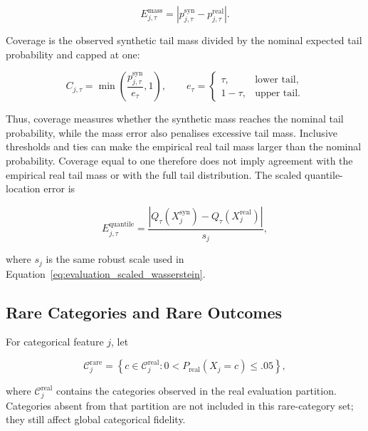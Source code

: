 \begin{equation}
    E_{j,\tau}^{\mathrm{mass}} =
        \left|p_{j,\tau}^{\mathrm{syn}}-p_{j,\tau}^{\mathrm{real}}\right|.
    \label{eq:evaluation_tail_mass}
\end{equation}

Coverage is the observed synthetic tail mass divided by the nominal expected
tail probability and capped at one:

\begin{equation}
    C_{j,\tau} = \min\left(
        \frac{p_{j,\tau}^{\mathrm{syn}}}{e_{\tau}},1\right),
    \qquad
    e_{\tau}=\begin{cases}
        \tau, & \text{lower tail},\\
        1-\tau, & \text{upper tail}.
    \end{cases}
    \label{eq:evaluation_tail_coverage}
\end{equation}

Thus, coverage measures whether the synthetic mass reaches the nominal tail
probability, while the mass error also penalises excessive tail mass.
Inclusive thresholds and ties can make the empirical real tail mass larger
than the nominal probability. Coverage equal to one therefore does not imply
agreement with the empirical real tail mass or with the full tail distribution. The
scaled quantile-location error is

\begin{equation}
    E_{j,\tau}^{\mathrm{quantile}} =
        \frac{\left|Q_{\tau}(X_j^{\mathrm{syn}})
        -Q_{\tau}(X_j^{\mathrm{real}})\right|}{s_j},
    \label{eq:evaluation_quantile_error}
\end{equation}

where $s_j$ is the same robust scale used in
Equation~\ref{eq:evaluation_scaled_wasserstein}.

\subsection{Rare Categories and Rare Outcomes}

For categorical feature $j$, let

\begin{equation}
    \mathcal{C}^{\mathrm{rare}}_j =
        \left\{c\in\mathcal{C}^{\mathrm{real}}_j:
        0<P_{\mathrm{real}}(X_j=c)\le .05\right\},
\end{equation}

where $\mathcal{C}^{\mathrm{real}}_j$ contains the categories observed in the
real evaluation partition. Categories absent from that partition are not
included in this rare-category set; they still affect global categorical
fidelity.

